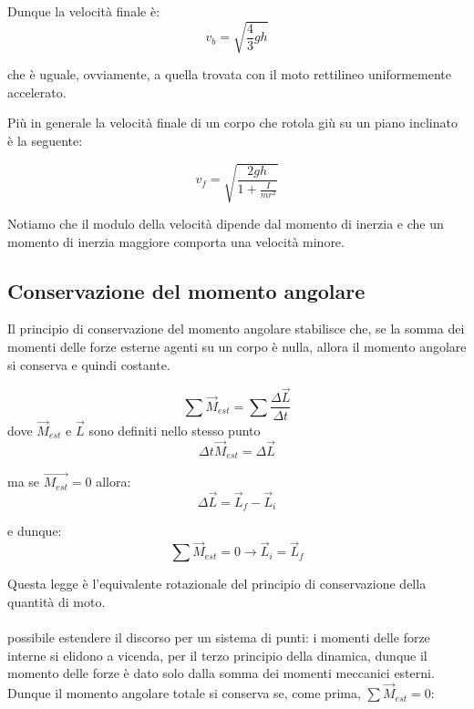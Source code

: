 Dunque la velocità finale è:
\begin{equation}
    v_b = \sqrt{\frac{4}{3}gh}
\end{equation}

che è uguale, ovviamente, a quella trovata con il moto rettilineo uniformemente accelerato.

Più in generale la velocità finale di un corpo che rotola giù su un piano inclinato è la seguente:

\begin{equation}
    v_f = \sqrt{\frac{2gh}{1+\frac{I}{mr^2}}}
\end{equation}

Notiamo che il modulo della velocità dipende dal momento di inerzia e che un momento di inerzia maggiore comporta una velocità minore. 

\subsection{Conservazione del momento angolare}
Il principio di conservazione del momento angolare stabilisce che, se la somma dei momenti delle forze esterne agenti su un corpo è nulla, allora il momento angolare si conserva e quindi costante. 

\begin{equation*}
    \sum \vec{M}_{est} = \sum \frac{\Delta \vec{L}}{\Delta t}
\end{equation*}
dove $\vec{M}_{est}$ e $\vec{L}$ sono definiti nello stesso punto 
\begin{equation*}
    \Delta t\vec{M}_{est} = \Delta\vec{L}
\end{equation*}

ma se $\vec{M_{est}} = 0 $ allora:
\begin{equation*}
    \Delta\vec{L} =  \vec{L}_f -  \vec{L}_i
\end{equation*}

e dunque:
\begin{equation}
   \sum \vec{M}_{est} = 0 \rightarrow  \vec{L}_i = \vec{L}_f 
\end{equation}

Questa legge è l’equivalente rotazionale del principio di conservazione della quantità di moto. 

\paragraph{}
\e possibile estendere il discorso per un sistema di punti: i momenti delle forze interne si elidono a vicenda, per il terzo principio della dinamica, dunque il momento delle forze è dato solo dalla somma dei momenti meccanici esterni. 
Dunque il momento angolare totale si conserva se, come prima, $\sum \vec{M}_{est}  = 0$:

